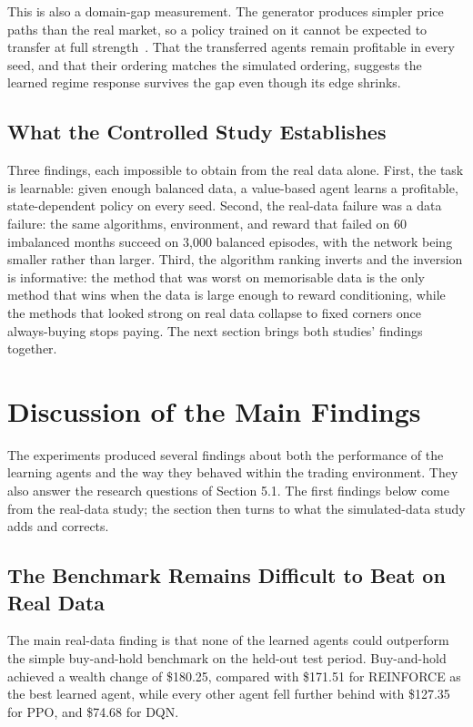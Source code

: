 This is also a domain-gap measurement. The generator produces simpler
price paths than the real market, so a policy trained on it cannot be
expected to transfer at full strength~\cite{silver2016}. That the
transferred agents remain profitable in every seed, and that their
ordering matches the simulated ordering, suggests the learned regime
response survives the gap even though its edge shrinks.

\subsection{What the Controlled Study Establishes}

Three findings, each impossible to obtain from the real data alone.
First, the task is learnable: given enough balanced data, a value-based
agent learns a profitable, state-dependent policy on every seed.
Second, the real-data failure was a data failure: the same algorithms,
environment, and reward that failed on 60 imbalanced months succeed on
3,000 balanced episodes, with the network being smaller rather than
larger. Third, the algorithm ranking inverts and the inversion is
informative: the method that was worst on memorisable data is the only
method that wins when the data is large enough to reward conditioning,
while the methods that looked strong on real data collapse to fixed
corners once always-buying stops paying. The next section brings both
studies' findings together.

\section{Discussion of the Main Findings}

The experiments produced several findings about both the performance of
the learning agents and the way they behaved within the trading
environment. They also answer the research questions of Section 5.1.
The first findings below come from the real-data study; the section then
turns to what the simulated-data study adds and corrects.

\subsection{The Benchmark Remains Difficult to Beat on Real Data}

The main real-data finding is that none of the learned agents could
outperform the simple buy-and-hold benchmark on the held-out test
period. Buy-and-hold achieved a wealth change of \$180.25, compared with
\$171.51 for REINFORCE as the best learned agent, while every other
agent fell further behind with \$127.35 for PPO, and \$74.68 for DQN.

